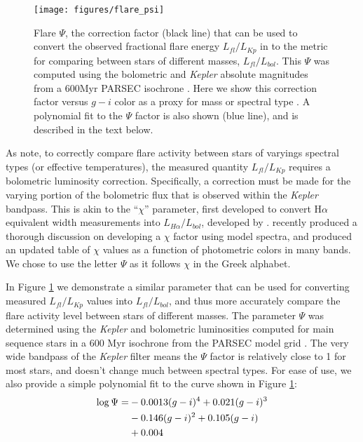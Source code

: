 \documentclass[preprint2]{aastex62}
\newcommand{\Kepler}{\textsl{Kepler}\xspace}
\begin{document}
\begin{figure}[!t]
\centering
\texttt{[image: figures/flare\_psi]}
\caption{
Flare $\Psi$, the correction factor (black line) that can be used to convert the observed fractional flare energy $L_{fl}/L_{Kp}$ in to the metric for comparing between stars of different masses, $L_{fl}/L_{bol}$. This $\Psi$ was computed using the bolometric and \Kepler absolute magnitudes from a 600Myr PARSEC isochrone \citep{bressan2012}. Here we show this correction factor versus $g-i$ color as a proxy for mass or spectral type \citep[e.g. see][]{covey2007,davenport2014}. A polynomial fit to the $\Psi$ factor is also shown (blue line), and is described in the text below.
}
\label{fig:chi}
\end{figure}


As \citet{lurie2015} note, to correctly compare flare activity between stars of varyings spectral types (or effective temperatures), the measured quantity $L_{fl}/L_{Kp}$ requires a bolometric luminosity correction. Specifically, a correction must be made for the varying portion of the bolometric flux that is observed within the \Kepler bandpass. This is akin to the ``$\chi$'' parameter, first developed to convert H$\alpha$ equivalent width measurements into  $L_{H\alpha}/L_{bol}$, developed by \citet{walkowicz2004}. \citet{douglas2014} recently produced a thorough discussion on developing a $\chi$ factor using model spectra, and produced an updated table of $\chi$ values as a function of photometric colors in many bands. We chose to use the letter $\Psi$ as it follows $\chi$ in the Greek alphabet.

In Figure \ref{fig:chi} we demonstrate a similar parameter that can be used for converting measured $L_{fl}/L_{Kp}$ values into $L_{fl}/L_{bol}$, and thus more accurately compare the flare activity level between stars of different masses. The parameter $\Psi$ was determined using the \Kepler and bolometric luminosities computed for main sequence stars in a 600 Myr isochrone from the PARSEC model grid \citet{bressan2012}. The very wide bandpass of the \Kepler filter means the $\Psi$ factor is relatively close to 1 for most stars, and doesn't change much between spectral types. For ease of use, we also provide a simple polynomial fit to the curve shown in Figure \ref{fig:chi}:
\begin{eqnarray}
\log \Psi =& -0.0013 (g-i)^4 + 0.021 (g-i)^3 \notag \\
& -0.146 (g-i)^2 + 0.105 (g-i) \notag \\ 
& + 0.004
\end{eqnarray}
\end{document}
